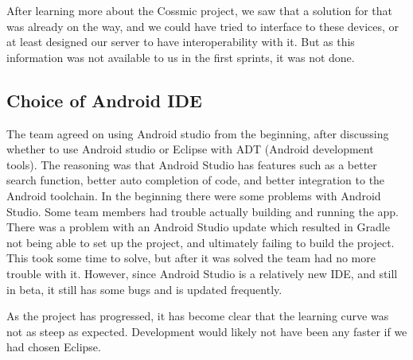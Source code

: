 After learning more about the Cossmic project, we saw that a solution for that was already on the way, and we could have tried to interface to these devices, or at least designed our server to have interoperability with it. But as this information was not available to us in the first sprints, it was not done. 

\subsection{Choice of Android IDE}
The team agreed on using Android studio from the beginning, after discussing whether to use Android studio or Eclipse with ADT (Android development tools). The reasoning was that Android Studio has features such as a better search function, better auto completion of code, and better integration to the Android toolchain. In the beginning there were some problems with Android Studio. Some team members had trouble actually building and running the app. There was a problem with an Android Studio update which resulted in Gradle not being able to set up the project, and ultimately failing to build the project. This took some time to solve, but after it was solved the team had no more trouble with it. However, since Android Studio is a relatively new IDE, and still in beta, it still has some bugs and is updated frequently.

As the project has progressed, it has become clear that the learning curve was not as steep as expected. Development would likely not have been any faster if we had chosen Eclipse.

